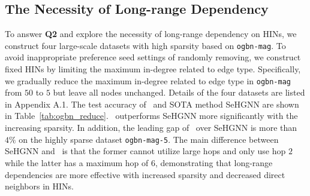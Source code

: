  
\subsection{The Necessity of Long-range Dependency}
To answer \textbf{Q2} and explore the necessity of long-range dependency on HINs, we construct four large-scale datasets with high sparsity based on \texttt{ogbn-mag}. To avoid inappropriate preference seed settings of randomly removing, we construct fixed HINs by limiting the maximum in-degree related to edge type. Specifically, we gradually reduce the maximum in-degree related to edge type in \texttt{ogbn-mag} from $50$ to $5$ but leave all nodes unchanged. Details of the four datasets are listed in Appendix A.1.     
The test accuracy of \model~and SOTA method SeHGNN are shown in Table~\ref{tab:ogbn_reduce}. 
\model~outperforms SeHGNN more significantly with the increasing sparsity. In addition, the leading gap of \model~over SeHGNN is more than $4\%$ on the highly sparse dataset \texttt{ogbn-mag-5}. The main difference between SeHGNN and \model~is that the former cannot utilize large hops and only use hop $2$ while the latter has a maximum hop of $6$, demonstrating that long-range dependencies are more effective with increased sparsity and decreased direct neighbors in HINs.




